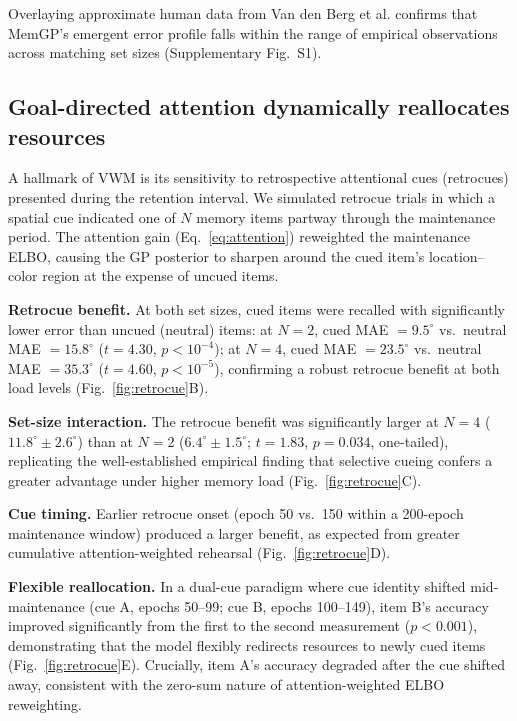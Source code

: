 \documentclass[11pt,letterpaper]{article}
\begin{document}
Overlaying approximate human data from Van den Berg et al. \cite{vandenbergVariabilityEncodingPrecision2012} confirms that MemGP's emergent error profile falls within the range of empirical observations across matching set sizes (Supplementary Fig.~S1).


\subsection{Goal-directed attention dynamically reallocates resources}

A hallmark of VWM is its sensitivity to retrospective attentional cues (retrocues) presented during the retention interval. We simulated retrocue trials in which a spatial cue indicated one of $N$ memory items partway through the maintenance period. The attention gain (Eq.~\ref{eq:attention}) reweighted the maintenance ELBO, causing the GP posterior to sharpen around the cued item's location--color region at the expense of uncued items.

\textbf{Retrocue benefit.} At both set sizes, cued items were recalled with significantly lower error than uncued (neutral) items: at $N\!=\!2$, cued MAE $= 9.5^\circ$ vs.\ neutral MAE $= 15.8^\circ$ ($t = 4.30$, $p < 10^{-4}$); at $N\!=\!4$, cued MAE $= 23.5^\circ$ vs.\ neutral MAE $= 35.3^\circ$ ($t = 4.60$, $p < 10^{-5}$), confirming a robust retrocue benefit at both load levels (Fig.~\ref{fig:retrocue}B).

\textbf{Set-size interaction.} The retrocue benefit was significantly larger at $N\!=\!4$ ($11.8^\circ \pm 2.6^\circ$) than at $N\!=\!2$ ($6.4^\circ \pm 1.5^\circ$; $t = 1.83$, $p = 0.034$, one-tailed), replicating the well-established empirical finding \cite{souzaRetrocuesRetroactiveAttentional2016, gunseliSerialOffloadingWorking2015} that selective cueing confers a greater advantage under higher memory load (Fig.~\ref{fig:retrocue}C).

\textbf{Cue timing.} Earlier retrocue onset (epoch 50 vs.\ 150 within a 200-epoch maintenance window) produced a larger benefit, as expected from greater cumulative attention-weighted rehearsal (Fig.~\ref{fig:retrocue}D).

\textbf{Flexible reallocation.} In a dual-cue paradigm where cue identity shifted mid-maintenance (cue A, epochs 50--99; cue B, epochs 100--149), item B's accuracy improved significantly from the first to the second measurement ($p < 0.001$), demonstrating that the model flexibly redirects resources to newly cued items (Fig.~\ref{fig:retrocue}E). Crucially, item A's accuracy degraded after the cue shifted away, consistent with the zero-sum nature of attention-weighted ELBO reweighting.
\end{document}

